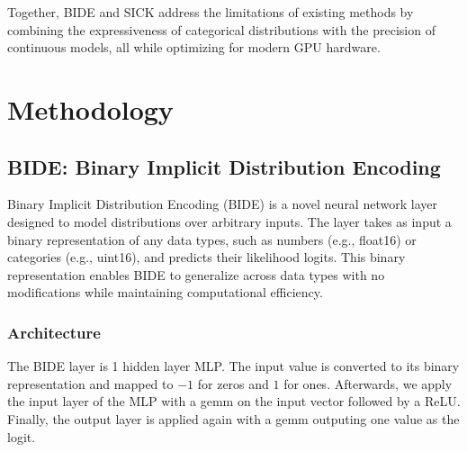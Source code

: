 \documentclass{article}
\begin{document}
Together, BIDE and SICK address the limitations of existing methods by combining the expressiveness of categorical distributions with the precision of continuous models, all while optimizing for modern GPU hardware.

\section{Methodology}

\subsection{BIDE: Binary Implicit Distribution Encoding}
Binary Implicit Distribution Encoding (BIDE) is a novel neural network layer designed to model distributions over arbitrary inputs. The layer takes as input a binary representation of any data types, such as numbers (e.g., float16) or categories (e.g., uint16), and predicts their likelihood logits. This binary representation enables BIDE to generalize across data types with no modifications while maintaining computational efficiency.

\subsubsection{Architecture}
The BIDE layer is 1 hidden layer MLP. The input value is converted to its binary representation and mapped to $-1$ for zeros and $1$ for ones. Afterwards, we apply the input layer of the MLP with a gemm on the input vector followed by a ReLU. Finally, the output layer is applied again with a gemm outputing one value as the logit.
\end{document}
